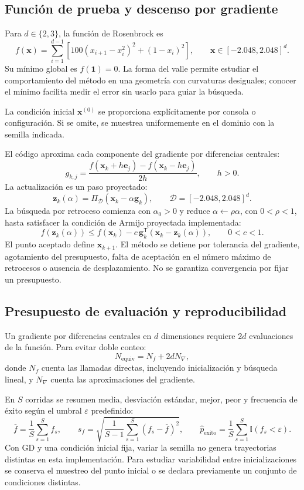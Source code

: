 \subsection{Función de prueba y descenso por gradiente}
Para $d\in\{2,3\}$, la función de Rosenbrock es
\[
f(\mathbf{x})=\sum_{i=1}^{d-1}\left[100(x_{i+1}-x_i^2)^2+(1-x_i)^2\right],
\qquad \mathbf{x}\in[-2.048,2.048]^d.
\]
Su mínimo global es $f(\mathbf{1})=0$. La forma del valle permite
estudiar el comportamiento del método en una geometría con curvaturas
desiguales; conocer el mínimo facilita medir el error sin usarlo para guiar
la búsqueda.

La condición inicial $\mathbf{x}^{(0)}$ se proporciona explícitamente
por consola o configuración. Si se omite, se muestrea uniformemente
en el dominio con la semilla indicada.

El código aproxima cada componente del gradiente por diferencias centrales:
\[
g_{k,j}=\frac{f(\mathbf{x}_k+h\mathbf{e}_j)-f(\mathbf{x}_k-h\mathbf{e}_j)}{2h},
\qquad h>0.
\]
La actualización es un paso proyectado:
\[
\mathbf{z}_k(\alpha)=\Pi_{\mathcal{D}}(\mathbf{x}_k-\alpha\mathbf{g}_k),
\qquad \mathcal{D}=[-2.048,2.048]^d.
\]
La búsqueda por retroceso comienza con $\alpha_0>0$ y reduce
$\alpha\leftarrow\rho\alpha$, con $0<\rho<1$, hasta satisfacer
la condición de Armijo proyectada implementada:
\[
f(\mathbf{z}_k(\alpha))\leq f(\mathbf{x}_k)
-c\,\mathbf{g}_k^{\mathsf T}(\mathbf{x}_k-\mathbf{z}_k(\alpha)),
\qquad 0<c<1.
\]
El punto aceptado define $\mathbf{x}_{k+1}$. El método se detiene
por tolerancia del gradiente, agotamiento del presupuesto,
falta de aceptación en el número máximo de retrocesos o ausencia
de desplazamiento. No se garantiza convergencia por fijar un presupuesto.

\subsection{Presupuesto de evaluación y reproducibilidad}
Un gradiente por diferencias centrales en $d$ dimensiones requiere
$2d$ evaluaciones de la función. Para evitar doble conteo:
\[
N_{\mathrm{equiv}}=N_f+2dN_{\nabla},
\]
donde $N_f$ cuenta las llamadas directas, incluyendo inicialización
y búsqueda lineal, y $N_{\nabla}$ cuenta las aproximaciones del gradiente.

En $S$ corridas se resumen media, desviación estándar, mejor, peor
y frecuencia de éxito según el umbral $\varepsilon$ predefinido:
\[
\overline{f}=\frac{1}{S}\sum_{s=1}^{S}f_s,\qquad
s_f=\sqrt{\frac{1}{S-1}\sum_{s=1}^{S}(f_s-\overline{f})^2},\qquad
\widehat{p}_{\mathrm{exito}}=\frac{1}{S}\sum_{s=1}^{S}\mathbb{I}(f_s<\varepsilon).
\]
Con GD y una condición inicial fija, variar la semilla no genera
trayectorias distintas en esta implementación. Para estudiar variabilidad
entre inicializaciones se conserva el muestreo del punto inicial o se
declara previamente un conjunto de condiciones distintas.
